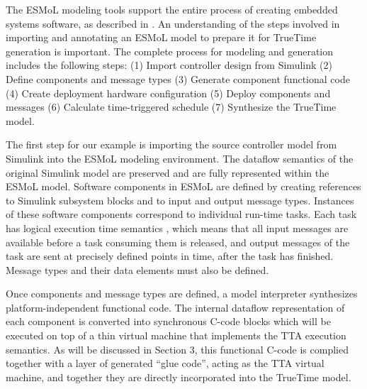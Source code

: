 The ESMoL modeling tools support the entire process of creating embedded systems software, as described in \cite{pvknks_09}.  An understanding of the steps involved in importing and annotating an ESMoL model to prepare it for TrueTime generation is important.  The complete process for modeling and generation includes the following steps: (1) Import controller design from Simulink (2) Define components and message types (3) Generate component functional code (4) Create deployment hardware configuration (5) Deploy components and messages (6) Calculate time-triggered schedule (7) Synthesize the TrueTime model.

The first step for our example is importing the source controller model from Simulink into the ESMoL modeling environment.  The dataflow semantics of the original Simulink model are preserved and are fully represented within the ESMoL model.  Software components in ESMoL are defined by creating references to Simulink subsystem blocks and to input and output message types.  Instances of these software components correspond to individual run-time tasks.  Each task has logical execution time semantics \cite{hhk_01}, which means that all input messages are available before a task consuming them is released, and output messages of the task are sent at precisely defined points in time, after the task has finished.  Message types and their data elements must also be defined.

Once components and message types are defined, a model interpreter synthesizes platform-independent functional code.  The internal dataflow representation of each component is converted into synchronous C-code blocks which will be executed on top of a thin virtual machine that implements the TTA execution semantics. As will be discussed in Section 3, this functional C-code is complied together with a layer of generated ``glue code'', acting as the TTA virtual machine, and together they are directly incorporated into the TrueTime model.

